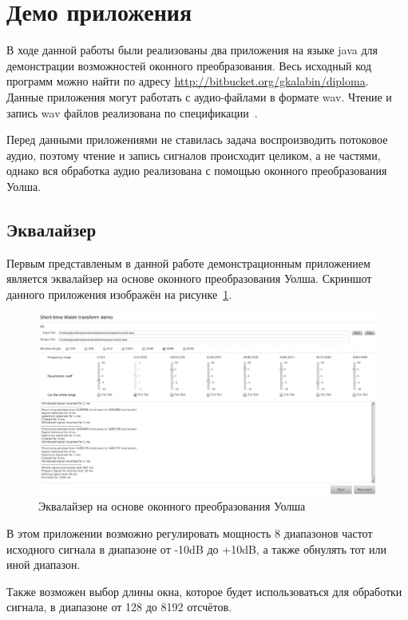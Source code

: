 \documentclass{matmex-diploma-custom}
\begin{document}
\section{Демо приложения}
\label{sec:demo}
В ходе данной работы были реализованы два приложения на языке java
для демонстрации возможностей оконного преобразования.
Весь исходный код программ можно найти по адресу \url{http://bitbucket.org/gkalabin/diploma}.
Данные приложения могут работать с аудио-файлами в формате wav. Чтение и
запись wav файлов реализована по спецификации~\cite{wav-spec}.

Перед данными приложениями не ставилась задача воспроизводить 
потоковое аудио, 
поэтому чтение и запись сигналов происходит целиком, а не частями,
однако вся обработка аудио реализована с помощью оконного преобразования
Уолша. 




\subsection{Эквалайзер}
Первым представленым в данной работе демонстрационным приложением является эквалайзер на основе 
оконного преобразования Уолша. Скриншот данного приложения изображён 
на рисунке~\ref{pic:eq-screenshot}.
\begin{figure}
    \centering
    \includegraphics[width=\textwidth, keepaspectratio=true]{../images/equalizer-screen.png}
    \caption{Эквалайзер на основе оконного преобразования Уолша}
    \label{pic:eq-screenshot}
\end{figure}

В этом приложении возможно регулировать мощность 8 диапазонов частот
исходного сигнала в диапазоне от -10dB до +10dB, а также обнулять тот или иной диапазон.

Также возможен выбор длины окна, которое будет использоваться для 
обработки сигнала, в диапазоне от 128 до 8192 отсчётов.
\end{document}
